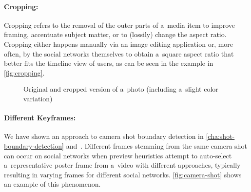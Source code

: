 \paragraph{Cropping:}

Cropping refers to the removal of the outer parts of a~media item
to improve framing, accentuate subject matter,
or to (lossily) change the aspect ratio.
Cropping either happens manually via an image editing application
or, more often, by the social networks themselves
to obtain a~square aspect ratio
that better fits the timeline view of users,
as can be seen in the example in \autoref{fig:cropping}.

\begin{figure}[!ht]
  \centering
  \caption[Original and cropped version of a~photo]
  {Original and cropped version of a~photo (including a~slight color variation)}
  \label{fig:cropping}
\end{figure}

\paragraph{Different Keyframes:}

We have shown an approach to camera shot boundary detection
in \autoref{cha:shot-boundary-detection} and~\cite{steiner2012shotdetection}.
Different frames stemming from the same camera shot
can occur on social networks when preview heuristics
attempt to auto-select a~representative poster frame from a~video with different approaches,
typically resulting in varying frames for different social networks.
\autoref{fig:camera-shot} shows an example of this phenomenon.

